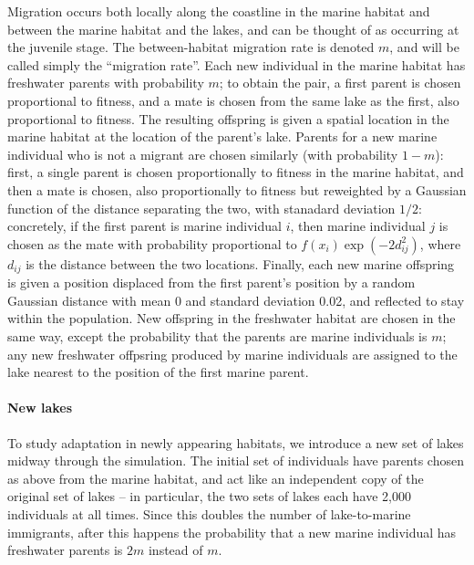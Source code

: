 \documentclass{article}
\begin{document}
Migration occurs both locally along the coastline in the marine habitat
and between the marine habitat and the lakes,
and can be thought of as occurring at the juvenile stage.
The between-habitat migration rate is denoted $m$,
and will be called simply the ``migration rate''.
Each new individual in the marine habitat has freshwater parents with probability $m$;
to obtain the pair, a first parent is chosen proportional to fitness,
and a mate is chosen from the same lake as the first, also proportional to fitness.
The resulting offspring is given a spatial location in the marine habitat
at the location of the parent's lake.
Parents for a new marine individual who is not a migrant are chosen similarly (with probability $1-m$):
first, a single parent is chosen proportionally to fitness in the marine habitat,
and then a mate is chosen, 
also proportionally to fitness but reweighted by a Gaussian function 
of the distance separating the two, with stanadard deviation $1/2$: 
concretely, if the first parent is marine individual $i$,
then marine individual $j$ is chosen as the mate
with probability proportional to $f(x_i) \exp(-2d_{ij}^2)$,
where $d_{ij}$ is the distance between the two locations.
Finally, each new marine offspring is given a position 
displaced from the first parent's position by a random Gaussian distance
with mean 0 and standard deviation 0.02, and reflected to stay within the population.
New offspring in the freshwater habitat are chosen in the same way,
except the probability that the parents are marine individuals is $m$;
any new freshwater offpsring produced by marine individuals
are assigned to the lake nearest to the position of the first marine parent.

\paragraph{New lakes}
To study adaptation in newly appearing habitats,
we introduce a new set of lakes midway through the simulation.
The initial set of individuals have parents chosen as above from the marine habitat,
and act like an independent copy of the original set of lakes -- in particular,
the two sets of lakes each have 2,000 individuals at all times.
Since this doubles the number of lake-to-marine immigrants,
after this happens the probability that a new marine individual has freshwater parents
is $2m$ instead of $m$.
\end{document}
